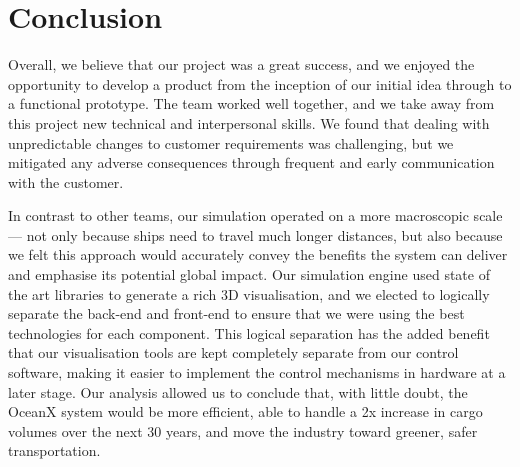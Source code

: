 \section{Conclusion}
Overall, we believe that our project was a great success, and we enjoyed the opportunity to develop a product from the inception of our initial idea through to a functional prototype. The team worked well together, and we take away from this project new technical and interpersonal skills. We found that dealing with unpredictable changes to customer requirements was challenging, but we mitigated any adverse consequences through frequent and early communication with the customer. 

In contrast to other teams, our simulation operated on a more macroscopic scale — not only because ships need to travel much longer distances, but also because we felt this approach would accurately convey the benefits the system can deliver and emphasise its potential global impact. Our simulation engine used state of the art libraries to generate a rich 3D visualisation, and we elected to logically separate the back-end and front-end to ensure that we were using the best technologies for each component. This logical separation has the added benefit that our visualisation tools are kept completely separate from our control software, making it easier to implement the control mechanisms in hardware at a later stage. Our analysis allowed us to conclude that, with little doubt, the OceanX system would be more efficient, able to handle a 2x increase in cargo volumes over the next 30 years, and move the industry toward greener, safer transportation.